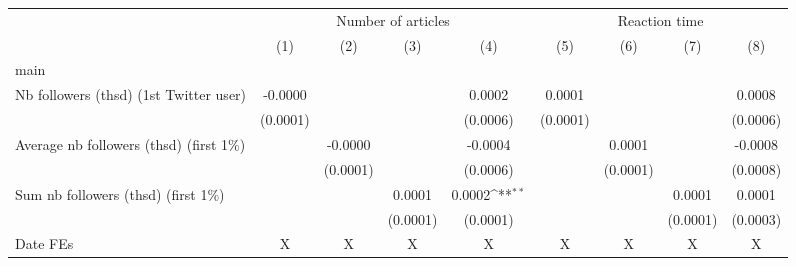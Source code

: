 {
\def\sym#1{\ifmmode^{#1}\else\(^{#1}\)\fi}
\begin{tabular}{l*{8}{c}}
\hline\hline
                    &\multicolumn{4}{c}{Number of articles}                                                 &\multicolumn{4}{c}{Reaction time}                                                      \\\cmidrule(lr){2-5}\cmidrule(lr){6-9}
                    &\multicolumn{1}{c}{(1)}         &\multicolumn{1}{c}{(2)}         &\multicolumn{1}{c}{(3)}         &\multicolumn{1}{c}{(4)}         &\multicolumn{1}{c}{(5)}         &\multicolumn{1}{c}{(6)}         &\multicolumn{1}{c}{(7)}         &\multicolumn{1}{c}{(8)}         \\
\hline
main                &                     &                     &                     &                     &                     &                     &                     &                     \\
Nb followers (thsd) (1st Twitter user)&     -0.0000         &                     &                     &      0.0002         &      0.0001         &                     &                     &      0.0008         \\
                    &    (0.0001)         &                     &                     &    (0.0006)         &    (0.0001)         &                     &                     &    (0.0006)         \\
Average nb followers (thsd) (first 1$\%$)&                     &     -0.0000         &                     &     -0.0004         &                     &      0.0001         &                     &     -0.0008         \\
                    &                     &    (0.0001)         &                     &    (0.0006)         &                     &    (0.0001)         &                     &    (0.0008)         \\
Sum nb followers (thsd) (first 1$\%$)&                     &                     &      0.0001         &      0.0002\sym{**} &                     &                     &      0.0001         &      0.0001         \\
                    &                     &                     &    (0.0001)         &    (0.0001)         &                     &                     &    (0.0001)         &    (0.0003)         \\
\hline
Date FEs            &           X         &           X         &           X         &           X         &           X         &           X         &           X         &           X         \\

\end{tabular}}
